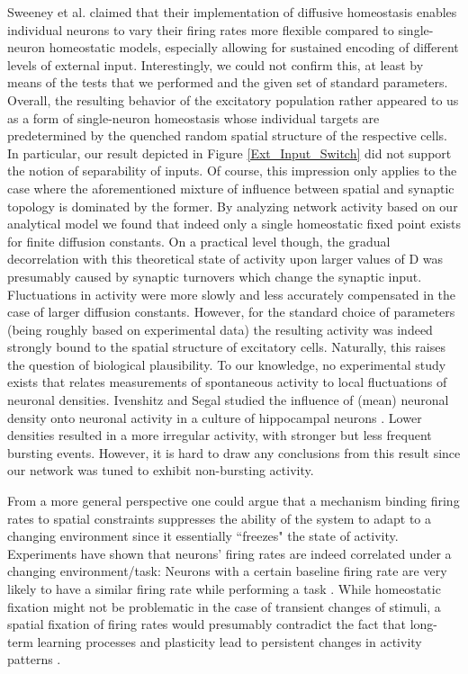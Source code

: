 \documentclass[10pt,a4paper]{article}
\begin{document}
Sweeney et al. claimed that their implementation of diffusive homeostasis enables individual neurons to vary their firing rates more flexible compared to single-neuron homeostatic models, especially allowing for sustained encoding of different levels of external input. Interestingly, we could not confirm this, at least by means of the tests that we performed and the given set of standard parameters. Overall, the resulting behavior of the excitatory population rather appeared to us as a form of single-neuron homeostasis whose individual targets are predetermined by the quenched random spatial structure of the respective cells. In particular, our result depicted in Figure \ref{Ext_Input_Switch} did not support the notion of separability of inputs. Of course, this impression only applies to the case where the aforementioned mixture of influence between spatial and synaptic topology is dominated by the former. By analyzing network activity based on our analytical model we found that indeed only a single homeostatic fixed point exists for finite diffusion constants. On a practical level though, the gradual decorrelation with this theoretical state of activity upon larger values of $\mathrm{D}$ was presumably caused by synaptic turnovers which change the synaptic input. Fluctuations in activity were more slowly and less accurately compensated in the case of larger diffusion constants. However, for the standard choice of parameters (being roughly based on experimental data) the resulting activity was indeed strongly bound to the spatial structure of excitatory cells. Naturally, this raises the question of biological plausibility. To our knowledge, no experimental study exists that relates measurements of spontaneous activity to local fluctuations of neuronal densities. Ivenshitz and Segal studied the influence of (mean) neuronal density onto neuronal activity in a culture of hippocampal neurons \cite{Ivenshitz_2010}. Lower densities resulted in a more irregular activity, with stronger but less frequent bursting events. However, it is hard to draw any conclusions from this result since our network was tuned to exhibit non-bursting activity.

From a more general perspective one could argue that a mechanism binding firing rates to spatial constraints suppresses the ability of the system to adapt to a changing environment since it essentially ``freezes" the state of activity. Experiments have shown that neurons' firing rates are indeed correlated under a changing environment/task: Neurons with a certain baseline firing rate are very likely to have a similar firing rate while performing a task \cite{Buzsaki_Fir_Rates_2014}. While homeostatic fixation might not be problematic in the case of transient changes of stimuli, a spatial fixation of firing rates would presumably contradict the fact that long-term learning processes and plasticity lead to persistent changes in activity patterns \cite{Lever_Long_Term_Plast_2002}.
\end{document}
